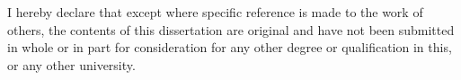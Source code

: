 
\begin{declaration}
I hereby declare that except where specific reference is made to the work of 
others, the contents of this dissertation are original and have not been 
submitted in whole or in part for consideration for any other degree or 
qualification in this, or any other university.
\end{declaration}

